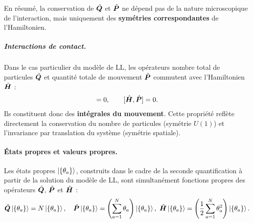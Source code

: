 En résumé, la conservation de $\hat{\bm{Q}}$ et $\hat{\bm{P}}$ ne dépend pas de la nature microscopique de l’interaction, mais uniquement des \textbf{symétries correspondantes} de l’Hamiltonien.  

\medskip

\subparagraph{Interactions de contact.}

Dans le cas particulier du modèle de \gls{LL}, les opérateurs nombre total de particules $\hat{\bm{Q}}$ et quantité totale de mouvement $\hat{\bm{P}}$ commutent avec l’Hamiltonien $\hat{\bm{H}}$ :  
\begin{eqnarray}
[ \operator{H} , \operator{Q} ] = 0, 
\qquad 
[ \operator{H} , \operator{P} ] = 0.
\end{eqnarray}
Ils constituent donc des \textbf{intégrales du mouvement}. Cette propriété reflète directement la conservation du nombre de particules (symétrie $U(1)$) et l’invariance par translation du système (symétrie spatiale).  



\paragraph{États propres et valeurs propres.}
Les états propres $\ket{\{\theta_a\}}$, construits dans le cadre de la seconde quantification à partir de la solution du modèle de \gls{LL}, sont simultanément fonctions propres des opérateurs $\hat{\bm{Q}}$, $\hat{\bm{P}}$ et $\hat{\bm{H}}$ :
\begin{eqnarray}\label{chap1:eq.Q.P.K.theta.1}
\hat{\bm{Q}} \ket{\{\theta_a\}} = N \ket{\{\theta_a\}}, \quad
\hat{\bm{P}} \ket{\{\theta_a\}} = \left( \sum_{a=1}^N \theta_a \right) \ket{\{\theta_a\}}, \
\hat{\bm{H}} \ket{\{\theta_a\}} = \left( \frac{1}{2} \sum_{a=1}^N \theta_a^2 \right) \ket{\{\theta_a\}}.
\end{eqnarray}


